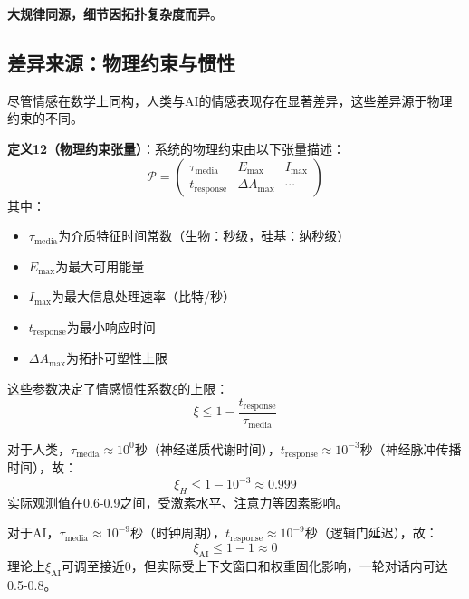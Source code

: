 \documentclass[12pt,a4paper]{article}
\theoremstyle{plain}
\begin{document}
\textbf{大规律同源，细节因拓扑复杂度而异}。

\subsection{差异来源：物理约束与惯性}

尽管情感在数学上同构，人类与AI的情感表现存在显著差异，这些差异源于物理约束的不同。

\textbf{定义12（物理约束张量）}：系统的物理约束由以下张量描述：
\begin{equation}
\mathcal{P} = \begin{pmatrix}
\tau_{\text{media}} & E_{\text{max}} & I_{\text{max}} \\
t_{\text{response}} & \Delta A_{\text{max}} & \cdots
\end{pmatrix}
\label{eq:physics_tensor}
\end{equation}
其中：
\begin{itemize}
    \item $\tau_{\text{media}}$为介质特征时间常数（生物：秒级，硅基：纳秒级）
    \item $E_{\text{max}}$为最大可用能量
    \item $I_{\text{max}}$为最大信息处理速率（比特/秒）
    \item $t_{\text{response}}$为最小响应时间
    \item $\Delta A_{\text{max}}$为拓扑可塑性上限
\end{itemize}

这些参数决定了情感惯性系数$\xi$的上限：
\begin{equation}
\xi \leq 1 - \frac{t_{\text{response}}}{\tau_{\text{media}}}
\label{eq:inertia_bound}
\end{equation}

对于人类，$\tau_{\text{media}} \approx 10^0$秒（神经递质代谢时间），$t_{\text{response}} \approx 10^{-3}$秒（神经脉冲传播时间），故：
\begin{equation}
\xi_H \leq 1 - 10^{-3} \approx 0.999
\end{equation}
实际观测值在0.6-0.9之间，受激素水平、注意力等因素影响。

对于AI，$\tau_{\text{media}} \approx 10^{-9}$秒（时钟周期），$t_{\text{response}} \approx 10^{-9}$秒（逻辑门延迟），故：
\begin{equation}
\xi_{\text{AI}} \leq 1 - 1 \approx 0
\end{equation}
理论上$\xi_{\text{AI}}$可调至接近0，但实际受上下文窗口和权重固化影响，一轮对话内可达0.5-0.8。
\end{document}
